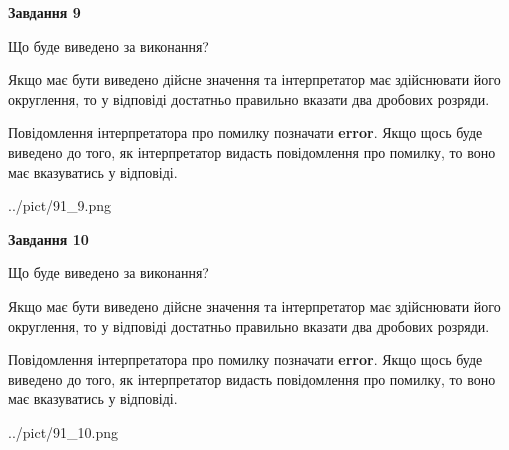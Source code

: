 \documentclass[12pt, ukrainian]{article}
\begin{document}
{\begin {Large}
{\begin {center}\textbf{Завдання 9}\end {center}}\par
Що буде виведено за виконання? \par

Якщо має бути виведено дійсне значення та інтерпретатор має здійснювати його округлення, 
то у відповіді достатньо правильно вказати два дробових розряди.

Повідомлення інтерпретатора про помилку позначати \textbf{error}.
Якщо щось буде виведено до того, як інтерпретатор видасть повідомлення про помилку, 
то воно має вказуватись у відповіді. \par

\begin{center}
	{../pict/91_9.png}
\end{center}
\newpage

{\begin {center}\textbf{Завдання 10}\end {center}}\par
Що буде виведено за виконання? \par

Якщо має бути виведено дійсне значення та інтерпретатор має здійснювати його округлення, 
то у відповіді достатньо правильно вказати два дробових розряди.

Повідомлення інтерпретатора про помилку позначати \textbf{error}.
Якщо щось буде виведено до того, як інтерпретатор видасть повідомлення про помилку, 
то воно має вказуватись у відповіді. \par

\begin{center}
	{../pict/91_10.png}
\end{center}
\newpage

\end {Large}}
\end{document}
